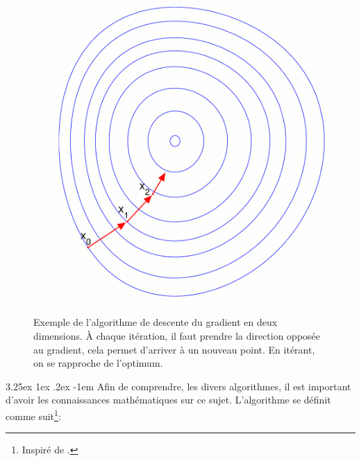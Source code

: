 \documentclass[a4paper, 11pt]{article}
\makeatletter
\renewcommand\paragraph{\@startsection{paragraph}{5}{\z@}%
  {3.25ex \@plus1ex \@minus.2ex}%
  {-1em}%
  {\normalfont\normalsize\bfseries}}
\makeatother
\begin{document}
\begin{figure}[H]
\centering
\includegraphics[scale=0.40]{images/descente_gradient_exemple}
\caption[]{Exemple de l'algorithme de descente du gradient en deux dimensions. À chaque itération,
il faut prendre la direction opposée au gradient\footnotemark, cela permet d'arriver à un nouveau
point. En itérant, on se rapproche de l'optimum. }
\end{figure}


\paragraph{}
Afin de comprendre, les divers algorithmes, il est important d'avoir les connaissances mathématiques
sur ce sujet. L'algorithme se définit comme suit\footnote{Inspiré de \cite{wikipedia_descente_du_gradient}.}:
\end{document}
